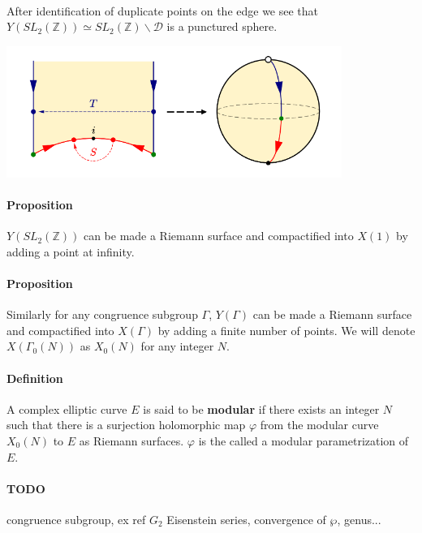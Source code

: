 \documentclass[letterpaper,10pt]{article}
\begin{document}
{\itshape \paragraph{} After identification of duplicate points on the edge we see that $Y(SL_2(\mathbb{Z})) \simeq SL_2(\mathbb{Z})\backslash \mathcal{D}$ is a punctured sphere.
}

\includegraphics[scale=1.0]{sphere}

\paragraph{Proposition}  $Y(SL_2(\mathbb{Z}))$ can be made a Riemann surface and compactified into $X(1)$ by adding a point at infinity.



\paragraph{Proposition} Similarly for any congruence subgroup $\Gamma$, $Y(\Gamma)$ can be made a Riemann surface and compactified into $X(\Gamma)$
 by adding a finite number of points. We will denote $X(\Gamma_0(N))$ as $X_0(N)$ for any integer $N$. 

\paragraph{Definition} A complex elliptic curve $E$ is said to be \textbf{modular} if there exists an integer $N$ such that there is a surjection holomorphic map $\varphi$ 
from the modular curve $X_0(N)$ to $E$ as Riemann surfaces. $\varphi$ is the called a modular parametrization of $E$.

\paragraph{TODO} congruence subgroup, ex ref \cite{zhou} \cite{springer} $G_2$ Eisenstein series, convergence of $\wp$, genus...


\printbibliography %
\end{document}
